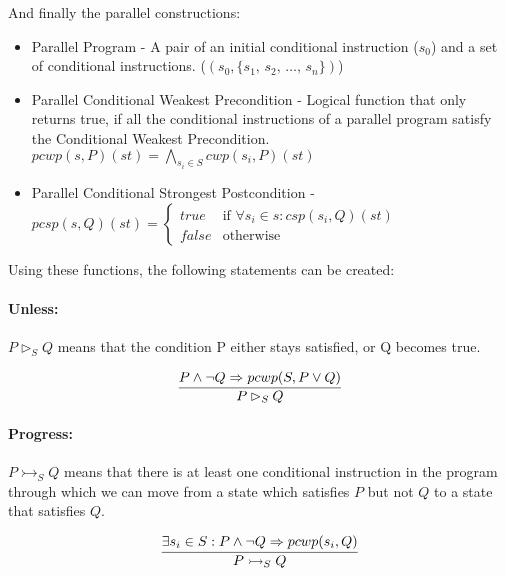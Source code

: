 And finally the parallel constructions:

\begin{itemize}
    \item Parallel Program - A pair of an initial conditional instruction ($s_0$) and a set of conditional instructions. ($(s_0, \{s_1, \, s_2, \, \dots , \, s_n\})$)

    \item Parallel Conditional Weakest Precondition - Logical function that only returns true, if all the conditional instructions of a parallel program satisfy the Conditional Weakest Precondition. \\
    $
    pcwp(s , P)(st) = \bigwedge\limits_{s_i \in S} cwp(s_i, P)(st)
    $
    \item Parallel Conditional Strongest Postcondition - \\
    $
    pcsp(s , Q)(st) =
        \left\{
        	\begin{array}{ll}
        		true & \mbox{if } \forall s_i \in s : csp(s_i, Q)(st) \\
        		false & \mbox{otherwise}
        	\end{array}
        \right.
    $
\end{itemize}

Using these functions, the following statements can be created:
\paragraph{Unless:}
$P \rhd_S Q$ means that the condition P either stays satisfied, or Q becomes true.

\begin{equation}
    \label{eq:unless}
    \infer{P \rhd_S Q}{P \land \neg Q \Rightarrow pcwp(S, P \lor Q)}
\end{equation}

\paragraph{Progress:}
$P \rightarrowtail_S Q$ means that there is at least one conditional instruction in the program through which we can move from a state which satisfies $P$ but not $Q$ to a state that satisfies $Q$.

\begin{equation}
    \label{eq:progress}
    \infer{P \rightarrowtail_S Q}{\exists s_i \in S : P \land \neg Q \Rightarrow pcwp(s_i, Q)}
\end{equation}

